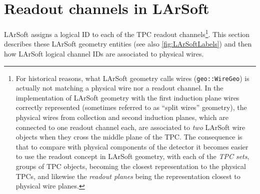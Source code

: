 \section{Readout channels in LArSoft}
\label{sec:LArSoft}

LArSoft assigns a logical ID to each of the TPC readout channels\footnote{
For historical reasons, what LArSoft geometry calls wires
(\texttt{geo::WireGeo}) is actually not matching a physical wire nor a readout
channel. In the implementation of LArSoft geometry with the first induction
plane wires correctly represented
(sometimes referred to as ``split wires'' geometry),
the physical wires from collection and
second induction planes, which are connected to one readout channel each,
are associated to \emph{two} LArSoft wire objects when they cross the middle
plane of the TPC.
The consequence is that to compare with physical components of the detector
it becomes easier to use the readout concept in LArSoft geometry,
with each of the \emph{TPC sets}, groups of TPC objects, becoming the closest
representation to the physical TPCs, and likewise the \emph{readout planes} being
the representation closest to physical wire planes.}.
This section describes these LArSoft geometry entities (see also \cref{fig:LArSoftLabels})
and then how LArSoft logical channel IDs are associated to physical wires.
